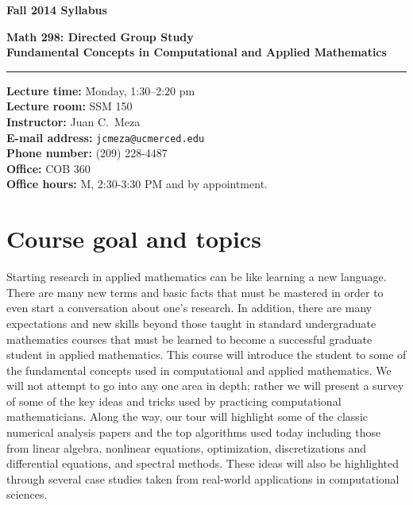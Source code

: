 \documentclass{article}
\begin{document}
\centerline{{\bf \Large Fall 2014 Syllabus}}
\vspace{.2in}
{\bf \large Math 298: Directed Group Study} \\
{\bf \large Fundamental Concepts in Computational and Applied Mathematics} \\
\rule{6.5in}{.02in}


\begin{tabbing}
{\bf Lecture time:} \quad \quad \= Monday, 1:30--2:20 pm \\
{\bf Lecture room:} \> SSM 150 \\
{\bf Instructor:} \> Juan C.~Meza \\
{\bf E-mail address:} \> {\tt jcmeza@ucmerced.edu} \\
{\bf Phone number:} \> (209) 228-4487 \\
{\bf Office:} \> COB 360 \\
{\bf Office hours:} \> M, 2:30-3:30 PM and by appointment. \\
\end{tabbing}

\section*{Course goal and topics} Starting research in applied mathematics can be like learning a new language.  There are many new terms and basic facts that must be mastered in order to even start a conversation about one's research.  In addition, there are many expectations and new skills beyond those taught in standard undergraduate mathematics courses that must be learned to become a successful graduate student in applied mathematics.  This course will introduce the student to some of the fundamental concepts used in computational and applied mathematics.  We will not attempt to go into any one area in depth; rather we will present a survey of some of the key ideas and tricks used by practicing computational mathematicians.  Along the way, our tour will highlight some of the classic numerical analysis papers and the top algorithms used today including those from linear algebra, nonlinear equations, optimization, discretizations and differential equations, and spectral methods.  These ideas will also be highlighted through several case studies taken from real-world applications in computational sciences.
\end{document}
